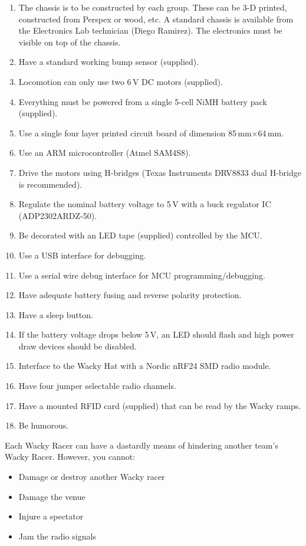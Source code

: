 \documentclass[11pt, a4paper]{article}
\begin{document}
\begin{enumerate}
\item The chassis is to be constructed by each group.  These can be 3-D printed,
  constructed from Perspex or wood, etc.  A standard chassis is available from
  the Electronics Lab technician (Diego Ramirez).  The electronics must be
  visible on top of the chassis.
\item Have a standard working bump sensor (supplied).
\item Locomotion can only use two 6\,V DC motors (supplied).
\item Everything must be powered from a single 5-cell NiMH battery pack (supplied).
\item Use a single four layer printed circuit board of dimension 85\,mm$\times$64\,mm.
\item Use an ARM microcontroller (Atmel SAM4S8).
\item Drive the motors using H-bridges (Texas Instruments DRV8833 dual
  H-bridge is recommended).
\item Regulate the nominal battery voltage to 5\,V with a buck
  regulator IC (ADP2302ARDZ-50).
\item Be decorated with an LED tape (supplied) controlled by the MCU.
\item Use a USB interface for debugging.
\item Use a serial wire debug interface for MCU programming/debugging.
\item Have adequate battery fusing and reverse polarity protection.
\item Have a sleep button.
\item If the battery voltage drops below 5\,V, an LED should flash and high power draw devices should be disabled.
\item Interface to the Wacky Hat with a Nordic nRF24 SMD radio module.
\item Have four jumper selectable radio channels.
\item Have a mounted RFID card (supplied) that can be read by the Wacky ramps.
\item Be humorous.
\end{enumerate}


Each Wacky Racer can have a dastardly means of hindering another
team's Wacky Racer.  However, you cannot:
%
\begin{itemize}
\item Damage or destroy another Wacky racer
\item Damage the venue
\item Injure a spectator
\item Jam the radio signals
\end{itemize}
\end{document}
